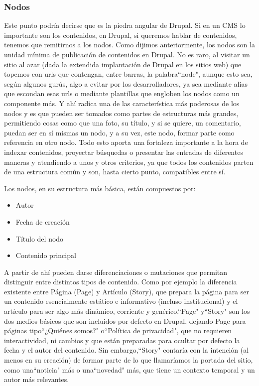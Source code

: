 \subsubsection{Nodos} 

\par Este punto podría decirse que es la piedra angular de Drupal. Si en un CMS lo importante son los contenidos, en Drupal, si queremos hablar de contenidos, tenemos que remitirnos a los nodos. Como dijimos anteriormente, los nodos son la unidad mínima de publicación de contenidos en Drupal. No es raro, al visitar un sitio al azar (dada la extendida implantación de Drupal en los sitios web) que topemos con urls que contengan, entre barras, la palabra``node", aunque esto sea, según algunos gurús, algo a evitar por los desarrolladores, ya sea mediante alias que escondan esas urls o mediante plantillas que engloben los nodos como un componente más.
Y ahí radica una de las característica más poderosas de los nodos y es que pueden ser tomados como partes de estructuras más grandes, permitiendo cosas como que una foto, su título, y si se quiere, un comentario, puedan ser en sí mismas un nodo, y a su vez, este nodo, formar parte como referencia en otro nodo. 
Todo esto aporta una fortaleza importante a la hora de indexar contenidos, proyectar búsquedas o presentar las entradas de diferentes maneras y atendiendo a unos y otros criterios, ya que todos los contenidos parten de una estructura común y son, hasta cierto punto, compatibles entre sí.

\par Los nodos, en su estructura más básica, están compuestos por:
\begin{itemize}
\item Autor
\item Fecha de creación
\item Título del nodo
\item Contenido principal
\end{itemize}

\par A partir de ahí pueden darse diferenciaciones o mutaciones que permitan distinguir entre distintos tipos de contenido. Como por ejemplo la diferencia existente entre Página (Page) y Artículo (Story), que prepara la página para ser un contenido esencialmente estático e informativo (incluso institucional) y el artículo para ser algo más dinámico, corriente y genérico.``Page" y``Story" son los dos medios básicos que son incluidos por defecto en Drupal, dejando Page para páginas tipo``¿Quiénes somos?" o``Política de privacidad", que no requieren interactividad, ni cambios y que están preparadas para ocultar por defecto la fecha y el autor del contenido. Sin embargo,``Story" contaría con la intención (al menos en su creación) de formar parte de lo que llamaríamos la portada del sitio, como una``noticia" más o una``novedad" más, que tiene un contexto temporal y un autor más relevantes.

